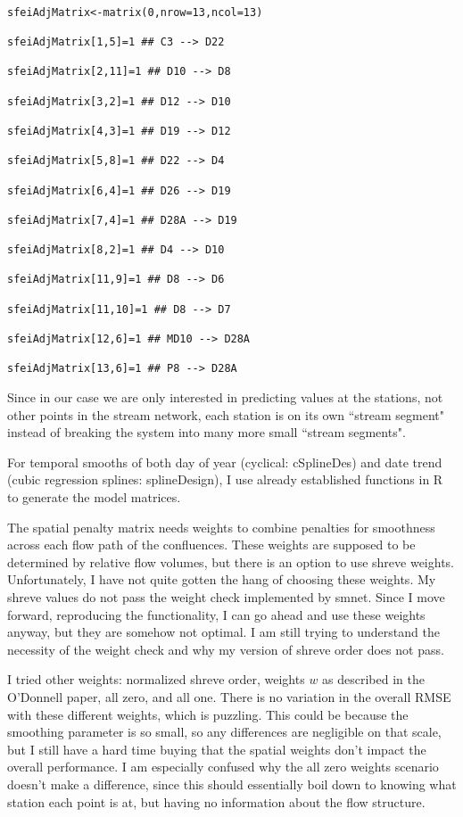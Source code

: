 \documentclass[12pt]{amsart}
\begin{document}
\begin{verbatim}

sfeiAdjMatrix<-matrix(0,nrow=13,ncol=13)

sfeiAdjMatrix[1,5]=1 ## C3 --> D22

sfeiAdjMatrix[2,11]=1 ## D10 --> D8

sfeiAdjMatrix[3,2]=1 ## D12 --> D10

sfeiAdjMatrix[4,3]=1 ## D19 --> D12

sfeiAdjMatrix[5,8]=1 ## D22 --> D4

sfeiAdjMatrix[6,4]=1 ## D26 --> D19

sfeiAdjMatrix[7,4]=1 ## D28A --> D19

sfeiAdjMatrix[8,2]=1 ## D4 --> D10

sfeiAdjMatrix[11,9]=1 ## D8 --> D6

sfeiAdjMatrix[11,10]=1 ## D8 --> D7

sfeiAdjMatrix[12,6]=1 ## MD10 --> D28A

sfeiAdjMatrix[13,6]=1 ## P8 --> D28A
\end{verbatim}

Since in our case we are only interested in predicting values at the stations, not other points in the stream network, each station is on its own ``stream segment" instead of breaking the system into many more small ``stream segments". 

For temporal smooths of both day of year (cyclical: cSplineDes) and date trend (cubic regression splines: splineDesign), I use already established functions in R to generate the model matrices.

The spatial penalty matrix needs weights to combine penalties for smoothness across each flow path of the confluences. These weights are supposed to be determined by relative flow volumes, but there is an option to use shreve weights. Unfortunately, I have not quite gotten the hang of choosing these weights. My shreve values do not pass the weight check implemented by smnet. Since I move forward, reproducing the functionality, I can go ahead and use these weights anyway, but they are somehow not optimal. I am still trying to understand the necessity of the weight check and why my version of shreve order does not pass.

I tried other weights: normalized shreve order, weights $w$ as described in the O'Donnell paper, all zero, and all one. There is no variation in the overall RMSE with these different weights, which is puzzling. This could be because the smoothing parameter is so small, so any differences are negligible on that scale, but I still have a hard time buying that the spatial weights don't impact the overall performance. I am especially confused why the all zero weights scenario doesn't make a difference, since this should essentially boil down to knowing what station each point is at, but having no information about the flow structure.
\end{document}
